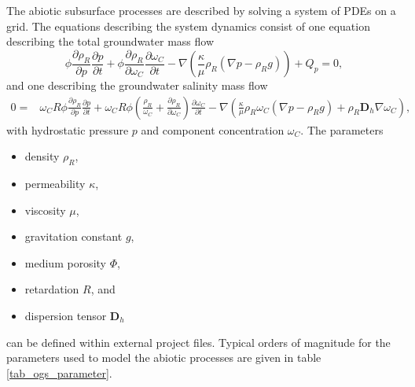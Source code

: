\documentclass[manusscript, 12p, authoryear]{elsarticle}
\begin{document}
The abiotic subsurface processes are described by solving a system of PDEs on a grid. The equations describing the system dynamics consist of one equation describing the total groundwater mass flow 
\begin{equation}
\phi\frac{\partial  \rho_R}{\partial p}\frac{\partial p}{\partial t} + \phi\frac{\partial \rho_R}{\partial \omega_C}\frac{\partial \omega_C}{\partial t} - \nabla \left(\frac{\kappa}{\mu}\rho_R \left(\nabla p - \rho_R g \right)\right) + Q_p = 0,
\end{equation}
and one describing the groundwater salinity mass flow
\begin{equation}
\begin{split}
0 =&
\omega_C R\phi\frac{\partial  \rho_R }{\partial p}\frac{\partial p}{\partial t}+\omega_C R\phi\left(\frac{\rho_R}{\omega_C}+\frac{\partial  \rho_R }{\partial \omega_C}\right)\frac{\partial \omega_C}{\partial t} - \nabla \left(  \frac{\kappa}{\mu} \rho_R \omega_C \left(\nabla p - \rho_R g \right) + \rho_R \mathbf{D}_h \nabla \omega_C\right),
\end{split}
\end{equation}
with hydrostatic pressure $p$ and component concentration $\omega_C$. 
The parameters 
\begin{itemize}
\item density $\rho_R$,
\item permeability $\kappa$,
\item viscosity $\mu$,
\item gravitation constant $g$,
\item medium porosity $\Phi$,
\item retardation $R$, and
\item dispersion tensor $\mathbf{D}_h$
\end{itemize}
can be defined within external project files.
Typical orders of magnitude for the parameters used to model the abiotic processes are given in table \ref{tab_ogs_parameter}.
\end{document}
